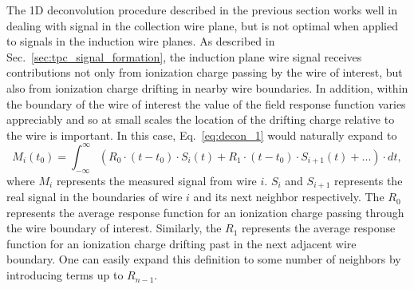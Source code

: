 The 1D deconvolution procedure described in the previous section 
works well in dealing with signal in the collection wire plane, but is not 
optimal when applied to signals in the induction wire planes. 
As described in Sec.~\ref{sec:tpc_signal_formation}, the induction plane wire 
signal receives contributions not only from ionization charge 
passing by the wire of interest, but also from ionization charge drifting in 
nearby wire boundaries. In addition, within the boundary of the wire of 
interest the value of the field response function varies appreciably 
and so at small scales the location of the drifting charge relative to the wire 
is important. In this case, Eq.~\ref{eq:decon_1} would naturally expand to 
\begin{equation}\label{eq:decon_2d_1}
M_i(t_0) = \int_{-\infty}^{\infty} \left( R_0 \cdot (t-t_0) \cdot S_i(t) + 
R_1 \cdot (t-t_0) \cdot S_{i+1} (t) + ...\right) \cdot dt,
\end{equation}
where $M_i$ represents the measured signal from wire $i$.  $S_i$ and
$S_{i+1}$ represents the real signal in the boundaries of wire $i$ and
its next neighbor respectively.
The $R_0$ represents the average response function for an ionization
charge passing through the wire boundary of interest.
Similarly, the $R_1$ represents the average response function for an
ionization charge drifting past in the next adjacent wire boundary. One can
easily expand this definition to some number of neighbors by introducing terms up 
to $R_{n-1}$.

